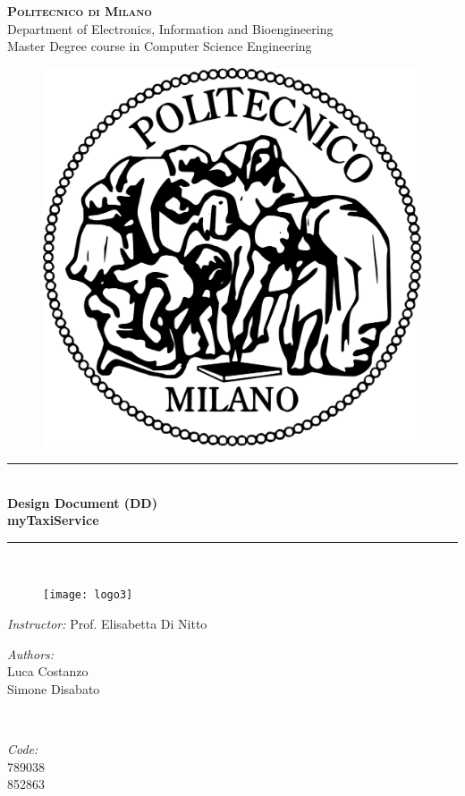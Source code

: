 \documentclass[12pt]{report}
\begin{document}
\pagestyle{empty}

\cleardoublepage


\begin{titlepage}

\newcommand{\HRule}{\rule{\linewidth}{0.5mm}} %

\center %

\textsc{\huge \bf{Politecnico di Milano}}\\[0.5cm]
\textsf{\Large Department of Electronics, Information and Bioengineering}\\[0.25cm] %
\textsf{\large Master Degree course in Computer Science Engineering}\\[0.5cm] %

\begin{figure}[h]
	\center \includegraphics[width = 3 cm]{Figures/PoliMi}
\end{figure}


\HRule \\
{\Huge \bfseries {Design Document (DD)} \\[0.2cm] \Large {myTaxiService}}\\ %
\HRule \\[0.2cm]

\begin{figure}[h]
	\center \texttt{[image: logo3]}
\end{figure}


\begin{flushleft}
	\large \textit{Instructor:} Prof. Elisabetta Di Nitto \\[0.5cm]

\begin{minipage}{0.45\textwidth}
\begin{flushleft} \large
\emph{Authors:}\\
Luca Costanzo\\
Simone Disabato
\end{flushleft}
\end{minipage}
~
\begin{minipage}{0.45\textwidth}
\begin{flushright} \large
\emph{Code:} \\
789038\\
852863
\end{flushright}
\end{minipage}\\[1cm]


\end{flushleft}
\end{titlepage}
\end{document}
